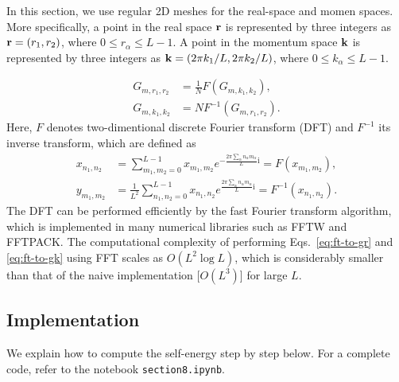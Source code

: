 \documentclass[submission, LectureNotes]{SciPost}
\newcommand{\bk}{\ensuremath{{\bf k}}}
\newcommand{\br}{\ensuremath{{\bf r}}}
\newcommand\ii{\mathrm{i}}%
\newcommand\iv{\ii\nu}%
\begin{document}
In this section, we use regular 2D meshes for the real-space and momen spaces.
More specifically, a point in the real space $\br$ is represented by three integers as
$\br=(r_1, r_2)$, where $0 \le r_\alpha \le L-1$.
A point in the momentum space $\bk$ is represented by three integers as
$\bk=(2\pi k_1/L, 2\pi k_2/L)$, where $0 \le k_\alpha \le L-1$.

\begin{align}
    G_{m,r_1, r_2} &= \frac{1}{N} F(G_{m, k_1, k_2}),\\
    G_{m,k_1, k_2} &= N F^{-1}(G_{m, r_1, r_2}).
\end{align}
Here, $F$ denotes two-dimentional discrete Fourier transform (DFT) and $F^{-1}$ its inverse transform,
which are defined as
\begin{align}
    x_{n_1, n_2} &= \sum_{m_1,m_2=0}^{L-1} x_{m_1,m_2} e^{-\frac{2\pi \sum_\alpha n_\alpha m_\alpha}{L}\ii}= F(x_{m_1, m_2}),\\
    y_{m_1, m_2} &= \frac{1}{L^2} \sum_{n_1,n_2=0}^{L-1} x_{n_1,n_2} e^{\frac{2\pi \sum_\alpha n_\alpha m_\alpha}{L}\ii} = F^{-1}(x_{n_1, n_2}).
\end{align}
The DFT can be performed efficiently by the fast Fourier transform algorithm,
which is implemented in many numerical libraries such as FFTW and FFTPACK.
The computational complexity of performing Eqs.~\eqref{eq:ft-to-gr} and \eqref{eq:ft-to-gk} using FFT
scales as $O(L^2 \log L)$,
which is considerably smaller than that of the naive implementation [$O(L^3)$] for large $L$.

\subsection{Implementation}
We explain how to compute the self-energy step by step below.
For a complete code, refer to the notebook \texttt{section8.ipynb}.
\end{document}
